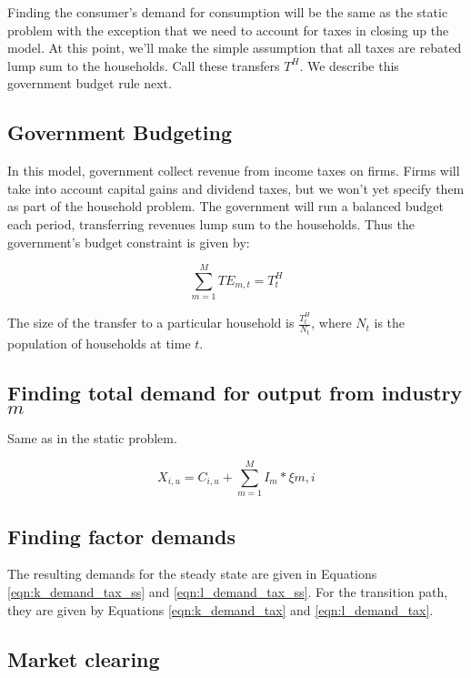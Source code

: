 \documentclass[letterpaper,12pt]{article}
\theoremstyle{definition}
\begin{document}
\begin{spacing}{1.5}
Finding the consumer's demand for consumption will be the same as the static problem with the exception that we need to account for taxes in closing up the model.  At this point, we'll make the simple assumption that all taxes are rebated lump sum to the households.  Call these transfers $T^{H}$.  We describe this government budget rule next.

\subsection*{Government Budgeting}

In this model, government collect revenue from income taxes on firms.  Firms will take into account capital gains and dividend taxes, but we won't yet specify them as part of the household problem.  The government will run a balanced budget each period, transferring revenues lump sum to the households.  Thus the government's budget constraint is given by: 

\begin{equation}
\sum_{m=1}^{M}TE_{m,t} = T^{H}_{t}
\end{equation}

The size of the transfer to a particular household is $\frac{T^{H}_{t}}{N_{t}}$, where $N_{t}$ is the population of households at time $t$.

\subsection*{Finding total demand for output from industry $m$}

Same as in the static problem.

\begin{equation}
\label{eqn:output_demand_dyn_tax_ss}
X_{i,u} = C_{i,u} + \sum_{m=1}^{M}I_{m}*\xi{m,i}
\end{equation}

\subsection*{Finding factor demands}

The resulting demands for the steady state are given in Equations \ref{eqn:k_demand_tax_ss} and \ref{eqn:l_demand_tax_ss}.  For the transition path, they are given by Equations  \ref{eqn:k_demand_tax} and \ref{eqn:l_demand_tax}.


\subsection*{Market clearing}


\end{spacing}
\end{document}
